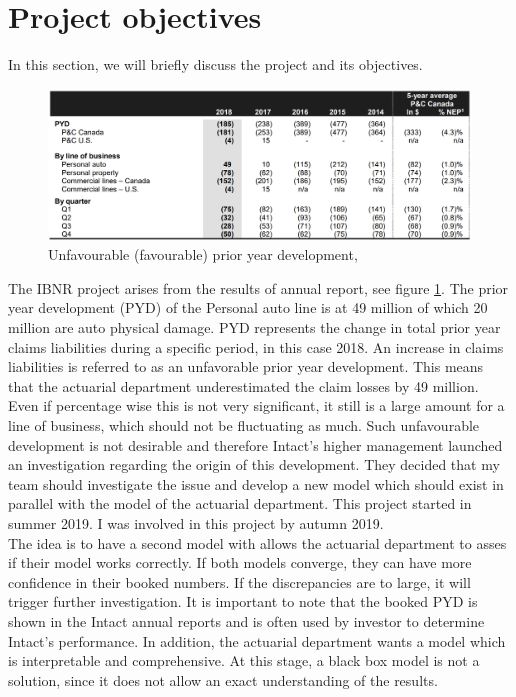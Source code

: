 \section{Project objectives}\label{sect_objective}
In this section, we will briefly discuss the project and its objectives.
\begin{figure}[H]
	\begin{center}
		\includegraphics[scale=0.4]{Graphiques/PYD} 
		\renewcommand{\figurename}{Figure}
		\caption{Unfavourable (favourable) prior year development, \cite{intact2018}}\label{Ill_annual_report}
	\end{center}
\end{figure}
The IBNR project arises from the results of \cite{intact2018} annual report, see figure \ref{Ill_annual_report}. The prior year development (PYD) of the Personal auto line is at 49 million of which 20 million are auto physical damage. PYD represents the change in total prior year claims liabilities during a specific period, in this case 2018. An increase in claims liabilities is referred to as an unfavorable prior year development. This means that the actuarial department underestimated the claim losses by 49 million. Even if percentage wise this is not very significant, it still is a large amount for a line of business, which should not be fluctuating as much. Such unfavourable development is not desirable and therefore Intact's higher management launched an investigation regarding the origin of this development. They decided that my team should investigate the issue and develop a new model which should exist in parallel with the model of the actuarial department. This project started in summer 2019. I was involved in this project by autumn 2019. \\ 
The idea is to have a second model with allows the actuarial department to asses if their model works correctly. If both models converge, they can have more confidence in their booked numbers. If the discrepancies are to large, it will trigger further investigation. It is important to note that the booked PYD is shown in the Intact annual reports and is often used by investor to determine Intact's performance. In addition, the actuarial department wants a model which is interpretable and comprehensive. At this stage, a black box model is not a solution, since it does not allow an exact understanding of the results.\\
